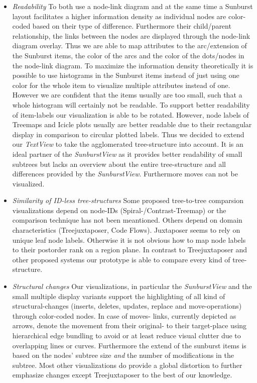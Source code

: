 \begin{itemize}
\item \emph{Readability} To both use a node-link diagram and at the same time a Sunburst layout facilitates a higher information density as individual nodes are color-coded based on their type of difference. Furthermore their child/parent relationship, the links between the nodes are displayed through the node-link diagram overlay. Thus we are able to map attributes to the arc/extension of the Sunburst items, the color of the arcs and the color of the dots/nodes in the node-link diagram. To maximize the information density theoretically it is possible to use histograms in the Sunburst items instead of just using one color for the whole item to visualize multiple attributes instead of one. However we are confident that the items usually are too small, such that a whole histogram will certainly not be readable. To support better readability of item-labels our visualization is able to be rotated. However, node labels of Treemaps and Icicle plots usually are better readable due to their rectangular display in comparison to circular plotted labels. Thus we decided to extend our \emph{TextView} to take the agglomerated tree-structure into account. It is an ideal partner of the \emph{SunburstView} as it provides better readability of small subtrees but lacks an overview about the entire tree-structure and all differences provided by the \emph{SunburstView}. Furthermore moves can not be visualized.
\item \emph{Similarity of ID-less tree-structures} Some proposed tree-to-tree comparsion visualizations depend on node-IDs (Spiral-/Contrast-Treemap\cite{tu2007visualizing}) or the comparison technique has not been meantioned. Others depend on domain characteristics (Treejuxtaposer\cite{munzner2003treejuxtaposer}, Code Flows\cite{telea2008code}). Juxtaposer seems to rely on unique leaf node labels. Otherwise it is not obvious how to map node labels to their postorder rank on a region plane. In contrast to Treejuxtaposer and other proposed systems our prototype is able to compare every kind of tree-structure.
\item \emph{Structural changes} Our visualizations, in particular the \emph{SunburstView} and the small multiple display variants support the highlighting of all kind of structural-changes (inserts, deletes, updates, replace and move-operations) through color-coded nodes. In case of moves- links, currently depicted as arrows, denote the movement from their original- to their target-place using hierarchical edge bundling to avoid or at least reduce visual clutter due to overlapping lines or curves. Furthermore the extend of the sunburst items is based on the nodes' subtree size \emph{and} the number of modifications in the subtree. Most other visualizations do provide a global distortion to further emphasize changes except Treejuxtaposer to the best of our knowledge.

\end{itemize}
